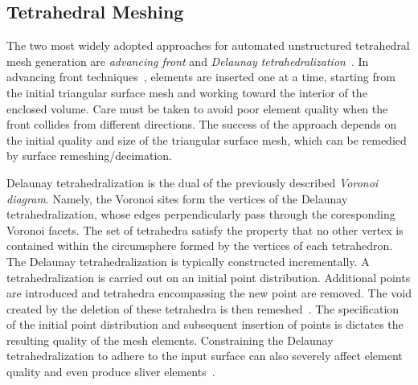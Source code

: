 \subsection{Tetrahedral Meshing}
\label{Tetrahedral Meshing}

The two most widely adopted approaches for automated unstructured tetrahedral mesh generation are \textit{advancing front} and \textit{Delaunay tetrahedralization}~\cite{lohner_1997}. In advancing front techniques~\cite{jin_1993, lohner_1988}, elements are inserted one at a time, starting from the initial triangular surface mesh and working toward the interior of the enclosed volume. Care must be taken to avoid poor element quality when the front collides from different directions. The success of the approach depends on the initial quality and size of the triangular surface mesh, which can be remedied by surface remeshing/decimation.

Delaunay tetrahedralization is the dual of the previously described \textit{Voronoi diagram}. Namely, the Voronoi sites form the vertices of the Delaunay tetrahedralization, whose edges perpendicularly pass through the coresponding Voronoi facets. The set of tetrahedra satisfy the property that no other vertex is contained within the circumsphere formed by the vertices of each tetrahedron. The Delaunay tetrahedralization is typically constructed incrementally. A tetrahedralization is carried out on an initial point distribution. Additional points are introduced and tetrahedra encompassing the new point are removed. The void created by the deletion of these tetrahedra is then remeshed~\cite{young_2008}. The specification of the initial point distribution and subsequent insertion of points is dictates the resulting quality of the mesh elements. Constraining the Delaunay tetrahedralization to adhere to the input surface can also severely affect element quality and even produce sliver elements~\cite{lohner_1997}.

